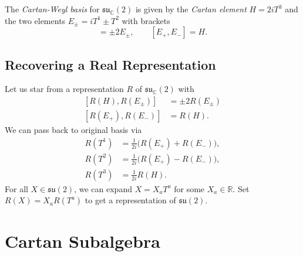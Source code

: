 \begin{definition}
  The \emph{Cartan-Weyl basis} for $\mathfrak{su}_{\mathbb{C}}(2)$ is given by the \emph{Cartan element} $H = 2 i T^3$ and the two elements $E_\pm = i T^1 \pm T^2$ with brackets
  \begin{equation}
    [H, E_\pm] = \pm 2 E_{\pm}, \qquad [E_+, E_-] = H.
  \end{equation}
\end{definition}

\subsection{Recovering a Real Representation}%

Let us star from a representation $R$ of $\mathfrak{su}_{\mathbb{C}}(2)$ with
\begin{subequations}
  \begin{align}
    \label{eq:15-star2}
    [R(H), R(E_{\pm})] &= \pm 2 R(E_\pm) \\
    [R(E_+), R(E_-)] &= R(H).
  \end{align}
\end{subequations}
We can pass back to original basis via
\begin{subequations}
  \begin{align}
    R(T^1) &= \frac{1}{2i} \bigl(R(E_+) + R(E_-)\bigr), \\
    R(T^2) &= \frac{1}{2i} \bigl(R(E_+) - R(E_-)\bigr), \\
    R(T^3) &= \frac{1}{2i} R(H).
  \end{align}
\end{subequations}
For all $X \in \mathfrak{su}(2)$, we can expand $X = X_{a} T^{a}$ for some ${X_{a} \in \mathbb{R}}$. Set $R(X) = X_{a} R(T^{a})$ to get a representation of $\mathfrak{su}(2)$.


\section{Cartan Subalgebra}%
\label{sec:cartan_subalgebra}

